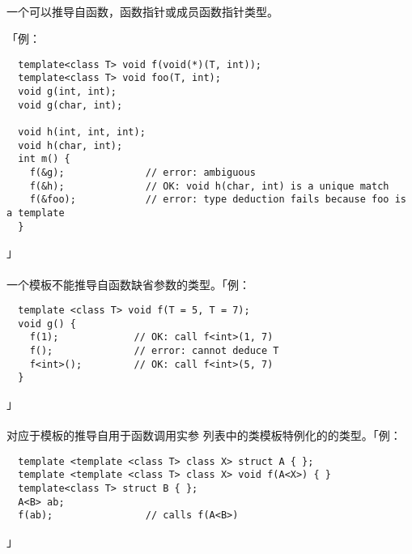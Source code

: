 \paragraph{}
一个可以推导自函数，函数指针或成员函数指针类型。

「例：
\begin{lstlisting}
  template<class T> void f(void(*)(T, int));
  template<class T> void foo(T, int);
  void g(int, int);
  void g(char, int);

  void h(int, int, int);
  void h(char, int);
  int m() {
    f(&g);              // error: ambiguous
    f(&h);              // OK: void h(char, int) is a unique match
    f(&foo);            // error: type deduction fails because foo is a template
  }
\end{lstlisting}」

\paragraph{}
一个模板不能推导自函数缺省参数的类型。「例：
\begin{lstlisting}
  template <class T> void f(T = 5, T = 7);
  void g() {
    f(1);             // OK: call f<int>(1, 7)
    f();              // error: cannot deduce T
    f<int>();         // OK: call f<int>(5, 7)
  }
\end{lstlisting}」

\paragraph{}
对应于模板的推导自用于函数调用实参
列表中的类模板特例化的的类型。「例：
\begin{lstlisting}
  template <template <class T> class X> struct A { };
  template <template <class T> class X> void f(A<X>) { }
  template<class T> struct B { };
  A<B> ab;
  f(ab);                // calls f(A<B>)
\end{lstlisting}」


